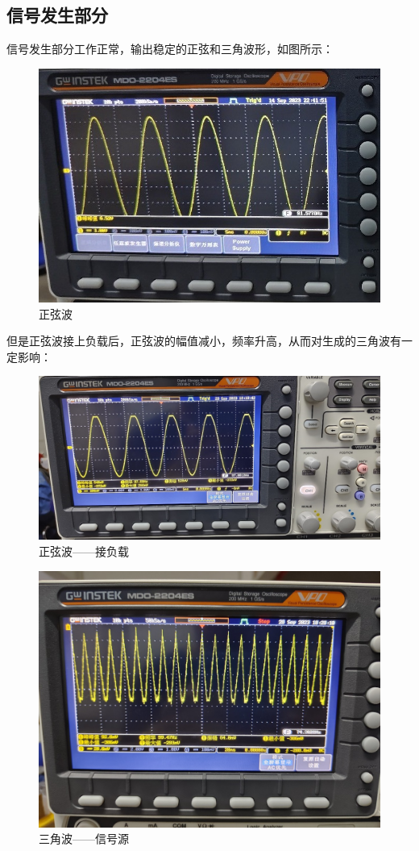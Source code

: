 \documentclass[a4paper]{article}
\theoremstyle{definition}
\theoremstyle{plain}
\theoremstyle{remark}
\begin{document}
\subsection{信号发生部分}
信号发生部分工作正常，输出稳定的正弦和三角波形，如图所示：
\begin{figure}[H]
	\centering
	\includegraphics[width=1.0\textwidth]{正弦波}
	\caption{正弦波}
\end{figure}
但是正弦波接上负载后，正弦波的幅值减小，频率升高，从而对生成的三角波有一定影响：
\begin{figure}[H]
	\centering
	\includegraphics[width=1.0\textwidth]{衰减的正弦波}
	\caption{正弦波——接负载}
\end{figure}
\begin{figure}[H]
	\centering
	\includegraphics[width=1.0\textwidth]{三角波——信号源}
	\caption{三角波——信号源}
\end{figure}
\end{document}
